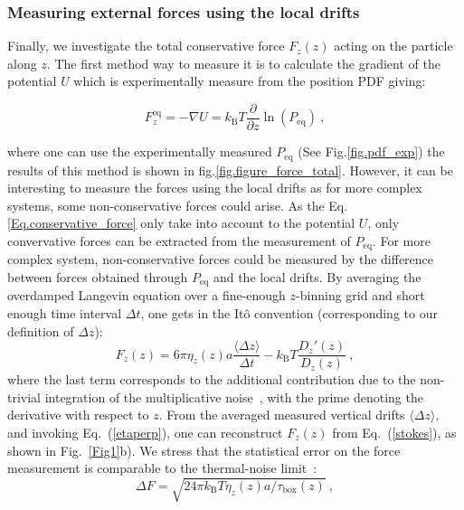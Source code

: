 \subsubsection{Measuring external forces using the local drifts}
Finally, we investigate the total conservative force $F_z(z)$ acting on the particle along $z$. The first method way to measure it is to calculate the gradient of the potential $U$ which is experimentally measure from the position \gls{PDF} giving:


\begin{equation}
	F_z^\mathrm{eq} = -\nabla U = k_\mathrm{B}T \frac{\partial}{\partial z} \ln (P_\mathrm{eq}) ~,
	\label{Eq.conservative_force}
\end{equation}

where one can use the experimentally measured $P_\mathrm{eq}$ (See Fig.\ref{fig.pdf_exp}) the results of this method is shown in fig.\ref{fig.figure_force_total}. However, it can be interesting to measure the forces using the local drifts as for more complex systems, some non-conservative forces could arise. As the Eq.\ref{Eq.conservative_force} only take into account to the potential $U$, only convervative forces can be extracted from the measurement of $P_\mathrm{eq}$. For more complex system, non-conservative forces could be measured by the difference between forces obtained through $P_\mathrm{eq}$ and the local drifts.  By averaging the overdamped Langevin equation over a fine-enough $z$-binning grid and short enough time interval $\Delta t$, one gets in the Itô convention (corresponding to our definition of $\Delta z$):
\begin{equation}
	F_z (z) = 6 \pi \eta_z (z ) a \frac{\langle\Delta z\rangle}{\Delta t} - k_\mathrm{B}T \frac{D_z'(z)}{D_z(z)} \ ,
	\label{stokes}
\end{equation}
where the last term corresponds to the additional contribution due to the non-trivial integration of the multiplicative noise~\cite{volpe_influence_2010,mannella_comment_2011,mannella_ito_2012, sancho_brownian_2011}, with the prime denoting the derivative with respect to $z$. From the averaged measured vertical drifts $\langle\Delta z\rangle$, and invoking Eq.~(\ref{etaperp}), one can reconstruct $F_z(z)$ from Eq.~(\ref{stokes}), as shown in Fig.~\ref{Fig1}b). We stress that the statistical error on the force measurement is comparable to the thermal-noise limit~\cite{liu_subfemtonewton_2016}: 
\begin{equation}
	\label{tnl}
	\Delta F=\sqrt{24\pi k_{\mathrm{B}}T \eta_z(z) a/ \tau_{\textrm{box}}(z)}\ ,
\end{equation}
